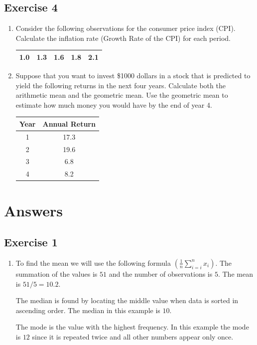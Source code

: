 \documentclass[
  letterpaper,
  DIV=11,
  numbers=noendperiod]{scrreprt}
\begin{document}
\hypertarget{exercise-4-2}{%
\subsection*{Exercise 4}\label{exercise-4-2}}

\begin{enumerate}
\def\labelenumi{\arabic{enumi}.}
\item
  Consider the following observations for the consumer price index
  (CPI). Calculate the inflation rate (Growth Rate of the CPI) for each
  period.

  \begin{longtable}[]{@{}ccccc@{}}
  \toprule()
  \endhead
  1.0 & 1.3 & 1.6 & 1.8 & 2.1 \\
  \bottomrule()
  \end{longtable}
\item
  Suppose that you want to invest \$1000 dollars in a stock that is
  predicted to yield the following returns in the next four years.
  Calculate both the arithmetic mean and the geometric mean. Use the
  geometric mean to estimate how much money you would have by the end of
  year 4.

  \begin{longtable}[]{@{}cc@{}}
  \toprule()
  Year & Annual Return \\
  \midrule()
  \endhead
  1 & 17.3 \\
  2 & 19.6 \\
  3 & 6.8 \\
  4 & 8.2 \\
  \bottomrule()
  \end{longtable}
\end{enumerate}

\hypertarget{answers-2}{%
\section{Answers}\label{answers-2}}

\hypertarget{exercise-1-5}{%
\subsection*{Exercise 1}\label{exercise-1-5}}

\begin{enumerate}
\def\labelenumi{\arabic{enumi}.}
\item
  To find the mean we will use the following formula
  \(( \frac{1}{n} \sum_{i=i}^{n} x_{i})\). The summation of the values
  is \(51\) and the number of observations is \(5\). The mean is
  \(51/5=10.2\).

  The median is found by locating the middle value when data is sorted
  in ascending order. The median in this example is \(10\).

  The mode is the value with the highest frequency. In this example the
  mode is \(12\) since it is repeated twice and all other numbers appear
  only once.
\end{enumerate}
\end{document}
